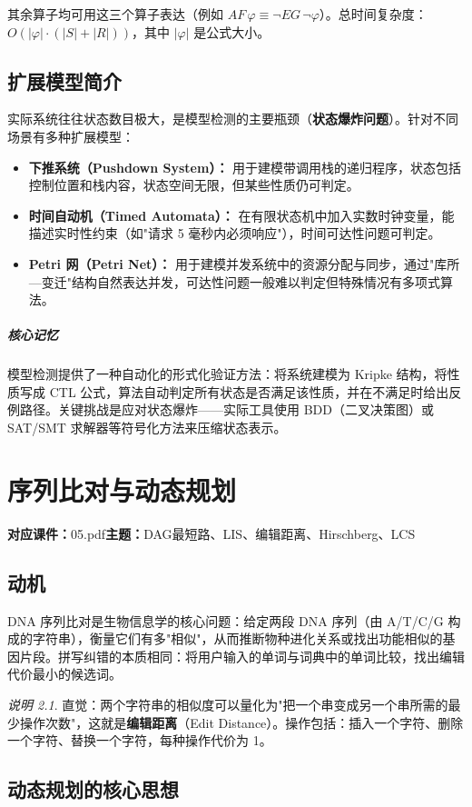 \documentclass[UTF8,openany,12pt]{ctexbook}
\theoremstyle{remark}
\newtheorem{remark}{说明}[chapter]
\newcommand{\lecture}[3]{
  \chapter{#2}
  \noindent\textbf{对应课件：}#1\hfill\textbf{主题：}#3
  \vspace{0.6em}
}
\newcommand{\keypoint}[1]{\paragraph{核心记忆}#1}
\begin{document}
其余算子均可用这三个算子表达（例如 $AF\, \varphi \equiv \neg EG\, \neg\varphi$）。总时间复杂度：$O(|\varphi| \cdot (|S| + |R|))$，其中 $|\varphi|$ 是公式大小。

\section{扩展模型简介}

实际系统往往状态数目极大，是模型检测的主要瓶颈（\textbf{状态爆炸问题}）。针对不同场景有多种扩展模型：

\begin{itemize}
  \item \textbf{下推系统（Pushdown System）：} 用于建模带调用栈的递归程序，状态包括控制位置和栈内容，状态空间无限，但某些性质仍可判定。
  \item \textbf{时间自动机（Timed Automata）：} 在有限状态机中加入实数时钟变量，能描述实时性约束（如"请求 5 毫秒内必须响应"），时间可达性问题可判定。
  \item \textbf{Petri 网（Petri Net）：} 用于建模并发系统中的资源分配与同步，通过"库所—变迁"结构自然表达并发，可达性问题一般难以判定但特殊情况有多项式算法。
\end{itemize}

\keypoint{模型检测提供了一种自动化的形式化验证方法：将系统建模为 Kripke 结构，将性质写成 CTL 公式，算法自动判定所有状态是否满足该性质，并在不满足时给出反例路径。关键挑战是应对状态爆炸——实际工具使用 BDD（二叉决策图）或 SAT/SMT 求解器等符号化方法来压缩状态表示。}

\lecture{05.pdf}{序列比对与动态规划}{DAG最短路、LIS、编辑距离、Hirschberg、LCS}

\section{动机}

DNA 序列比对是生物信息学的核心问题：给定两段 DNA 序列（由 A/T/C/G 构成的字符串），衡量它们有多"相似"，从而推断物种进化关系或找出功能相似的基因片段。拼写纠错的本质相同：将用户输入的单词与词典中的单词比较，找出编辑代价最小的候选词。

\begin{remark}
直觉：两个字符串的相似度可以量化为"把一个串变成另一个串所需的最少操作次数"，这就是\textbf{编辑距离}（Edit Distance）。操作包括：插入一个字符、删除一个字符、替换一个字符，每种操作代价为 1。
\end{remark}

\section{动态规划的核心思想}
\end{document}

